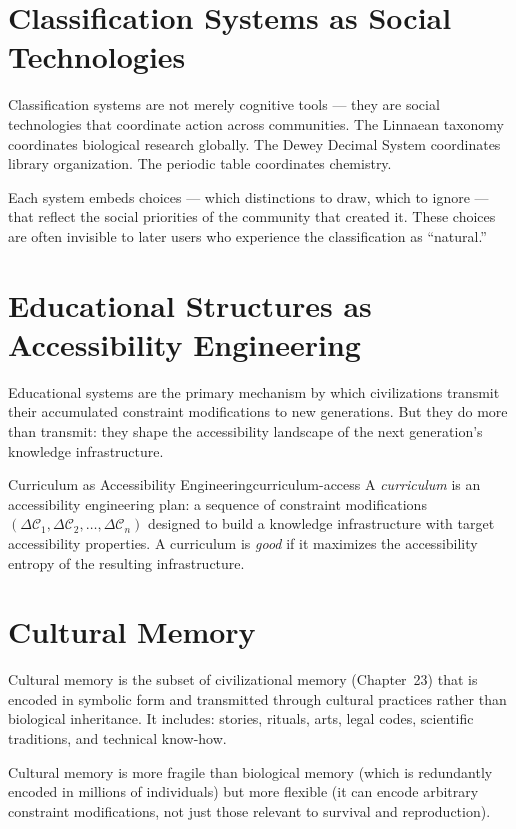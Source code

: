 \section{Classification Systems as Social Technologies}

Classification systems are not merely cognitive tools — they are social
technologies that coordinate action across communities. The Linnaean
taxonomy coordinates biological research globally. The Dewey Decimal
System coordinates library organization. The periodic table coordinates
chemistry.

Each system embeds choices — which distinctions to draw, which to
ignore — that reflect the social priorities of the community that
created it. These choices are often invisible to later users who
experience the classification as ``natural.''

\section{Educational Structures as Accessibility Engineering}

Educational systems are the primary mechanism by which civilizations
transmit their accumulated constraint modifications to new generations.
But they do more than transmit: they shape the accessibility landscape
of the next generation's knowledge infrastructure.

\begin{definition}{Curriculum as Accessibility Engineering}{curriculum-access}
  A \emph{curriculum} is an accessibility engineering plan: a
  sequence of constraint modifications $(\Delta\mathcal{C}_1,
  \Delta\mathcal{C}_2, \ldots, \Delta\mathcal{C}_n)$ designed to
  build a knowledge infrastructure with target accessibility
  properties. A curriculum is \emph{good} if it maximizes the
  accessibility entropy of the resulting infrastructure.
\end{definition}

\section{Cultural Memory}

Cultural memory is the subset of civilizational memory (Chapter~23)
that is encoded in symbolic form and transmitted through cultural
practices rather than biological inheritance. It includes: stories,
rituals, arts, legal codes, scientific traditions, and technical
know-how.

Cultural memory is more fragile than biological memory (which is
redundantly encoded in millions of individuals) but more flexible
(it can encode arbitrary constraint modifications, not just those
relevant to survival and reproduction).

